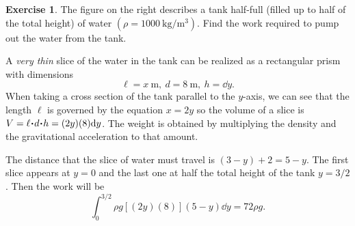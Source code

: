 \documentclass[12pt]{article}
\theoremstyle{plain}
\theoremstyle{definition}
\newtheorem{Ej}[Th]{Exercise}         %
\theoremstyle{remark}
\renewcommand{\l}{\ell}
\renewcommand{\:}{\colon}           %
\renewcommand{\.}{\Cdot}                %
\begin{document}
\begin{Ej}
  The figure on the right describes a tank half-full (filled up to half of the total height) of water $(\rho=1000\ \si{\kilo\gram\per\metre\cubed})$. Find the work required to pump out the water from the tank.
\end{Ej}

\begin{ptcb}
  A \emph{very thin} slice of the water in the tank can be realized as a rectangular prism with dimensions 
  $$\l=x\ \si\metre,\ d=8\ \si\metre,\ h=\dd y.$$
  When taking a cross section of the tank parallel to the $y$-axis, we can see that the length $\l$ is governed by the equation $x=2y$ so the volume of a slice is $V=\l\.d\.h=(2y)(8)\dd y$. The weight is obtained by multiplying the density and the gravitational acceleration to that amount.\par 
  The distance that the slice of water must travel is $(3-y)+2=5-y$. The first slice appears at $y=0$ and the last one at half the total height of the tank $y=3/2$. Then the work will be 
  $$\int_0^{3/2}\rho g[(2y)(8)](5-y)\dd y=72\rho g.$$
\end{ptcb}

\end{document}
